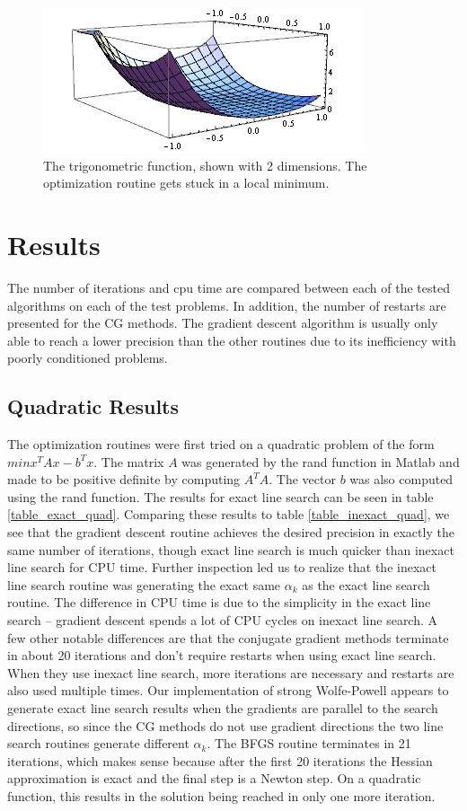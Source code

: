 \documentclass[12pt]{amsart}
\begin{document}
\begin{figure}[thpb]
\centering
\includegraphics[scale=0.60]{images/3dtrig.jpg}
\caption{The trigonometric function, shown with 2 dimensions.  The optimization routine gets stuck in a local minimum.}
\label{fig:3d-trig}
\end{figure}

\section{Results}
The number of iterations and cpu time are compared between each of the tested algorithms on each of the test problems.  In addition, the number of restarts are presented for the CG methods.  The gradient descent algorithm is usually only able to reach a lower precision than the other routines due to its inefficiency with poorly conditioned problems. 

\subsection{Quadratic Results}

The optimization routines were first tried on a quadratic problem of the form $min x^T A x - b^T x $.  The matrix $A$ was generated by the rand function in Matlab and made to be positive definite by computing $A^T A$.  The vector $b$ was also computed using the rand function.  The results for exact line search can be seen in table \ref{table_exact_quad}.  Comparing these results to table \ref{table_inexact_quad}, we see that the gradient descent routine achieves the desired precision in exactly the same number of iterations, though exact line search is much quicker than inexact line search for CPU time.  Further inspection led us to realize that the inexact line search routine was generating the exact same $\alpha_k$ as the exact line search routine.  The difference in CPU time is due to the simplicity in the exact line search -- gradient descent spends a lot of CPU cycles on inexact line search.  A few other notable differences are that the conjugate gradient methods terminate in about 20 iterations and don't require restarts when using exact line search.  When they use inexact line search, more iterations are necessary and restarts are also used multiple times.  Our implementation of strong Wolfe-Powell appears to generate exact line search results when the gradients are parallel to the search directions, so since the CG methods do not use gradient directions the two line search routines generate different $\alpha_k$.  The BFGS routine terminates in 21 iterations, which makes sense because after the first 20 iterations the Hessian approximation is exact and the final step is a Newton step.  On a quadratic function, this results in the solution being reached in only one more iteration.  
\end{document}
